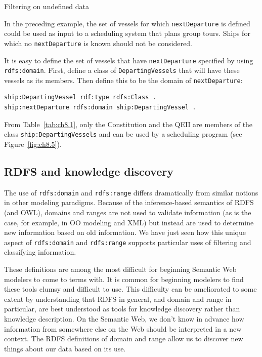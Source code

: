 \begin{challenge}{Filtering on undefined data}
\label{chal:12}

In the preceding example, the set of vessels for which \texttt{nextDeparture} is
defined could be used as input to a scheduling system that plans group
tours. Ships for which no \texttt{nextDeparture} is known should not be
considered.

\solution

It is easy to define the set of vessels that have \texttt{nextDeparture}
specified by using \texttt{rdfs:domain}. First, define a class of
\texttt{DepartingVessels} that will have these vessels as its members. Then
define this to be the domain of \texttt{nextDeparture}:

\begin{lstlisting}
ship:DepartingVessel rdf:type rdfs:Class .
ship:nextDeparture rdfs:domain ship:DepartingVessel .
\end{lstlisting}

From Table~\ref{tab:ch8.1}, only the Constitution and the QEII are members of the
class 
\texttt{ship:DepartingVessels} and can be used by a scheduling program (see
Figure~\ref{fig:ch8.5}).
\end{challenge}

\subsection{RDFS and knowledge discovery}

The use of \texttt{rdfs:domain} and \texttt{rdfs:range} differs dramatically from similar
notions in other modeling paradigms. Because of the inference-based
semantics of RDFS (and OWL), domains and ranges are not used to validate
information (as is the case, for example, in OO modeling and XML) but
instead are used to determine new information based on old information.
We have just seen how this unique aspect of \texttt{rdfs:domain} and \texttt{rdfs:range}
supports particular uses of filtering and classifying information.

These definitions are among the most difficult for beginning Semantic
Web modelers to come to terms with. It is common for beginning modelers
to find these tools clumsy and difficult to use. This difficulty can be
ameliorated to some extent by understanding that RDFS in general, and
domain and range in particular, are best understood as tools for
knowledge discovery rather than knowledge description. On the Semantic
Web, we don't know in advance how information from somewhere else
on the Web should be interpreted in a new context. The RDFS definitions
of domain and range
allow us to discover new things about our data based on its use.


